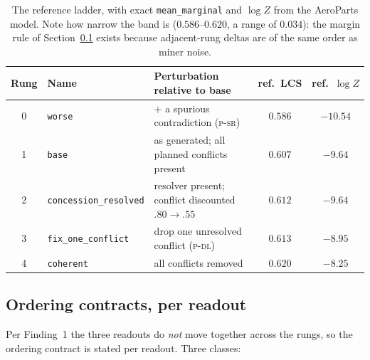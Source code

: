 \documentclass[11pt]{article}
\newcommand{\readout}[1]{\texttt{#1}}
\begin{document}
\begin{table}[h]\centering\small
\renewcommand{\arraystretch}{1.1}
\begin{tabular}{@{}clp{6.9cm}cc@{}}
\toprule
\textbf{Rung} & \textbf{Name} & \textbf{Perturbation relative to base} &
\textbf{ref.\ LCS} & \textbf{ref.\ $\log Z$}\\
\midrule
0 & \texttt{worse}                & $+$ a spurious contradiction (\textsc{p-sr}) & $0.586$ & $-10.54$\\
1 & \texttt{base}                 & as generated; all planned conflicts present  & $0.607$ & $-9.64$\\
2 & \texttt{concession\_resolved} & resolver present; conflict discounted $.80\!\to\!.55$ & $0.612$ & $-9.64$\\
3 & \texttt{fix\_one\_conflict}   & drop one unresolved conflict (\textsc{p-dl}) & $0.613$ & $-8.95$\\
4 & \texttt{coherent}             & all conflicts removed                        & $0.620$ & $-8.25$\\
\bottomrule
\end{tabular}
\caption{The reference ladder, with exact \readout{mean\_marginal} and $\log Z$ from the
AeroParts model. Note how narrow the band is ($0.586$--$0.620$, a range of $0.034$): the
margin rule of Section~\ref{sec:contracts} exists because adjacent-rung deltas are of the same
order as miner noise.}
\label{tab:rungs}
\end{table}

\subsection{Ordering contracts, per readout}
\label{sec:contracts}

Per Finding~1 the three readouts do \emph{not} move together across the rungs, so the ordering
contract is stated per readout. Three classes:
\end{document}
